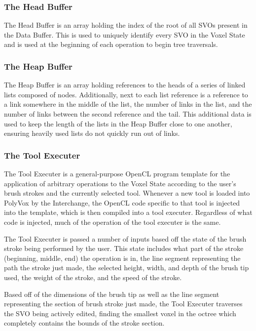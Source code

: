 \documentclass[onecolumn, draftclsnofoot,10pt, compsoc]{IEEEtran}
\begin{document}
\subsubsection{The Head Buffer}

The Head Buffer is an array holding the index of the root of all SVOs present in the Data Buffer. This is used to uniquely identify every SVO in the Voxel State and is used at the beginning of each operation to begin tree traversals.\\

\subsubsection{The Heap Buffer}

The Heap Buffer is an array holding references to the heads of a series of linked lists composed of nodes. Additionally, next to each list reference is a reference to a link somewhere in the middle of the list, the number of links in the list, and the number of links between the second reference and the tail. This additional data is used to keep the length of the lists in the Heap Buffer close to one another, ensuring heavily used lists do not quickly run out of links.\\


\subsubsection{The Tool Executer}

The Tool Executer is a general-purpose OpenCL program template for the application of arbitrary operations to the Voxel State according to the user’s brush strokes and the currently selected tool. Whenever a new tool is loaded into PolyVox by the Interchange, the OpenCL code specific to that tool is injected into the template, which is then compiled into a tool executer. Regardless of what code is injected, much of the operation of the tool executer is the same.

The Tool Executer is passed a number of inputs based off the state of the brush stroke being performed by the user. This state includes what part of the stroke (beginning, middle, end) the operation is in, the line segment representing the path the stroke just made, the selected height, width, and depth of the brush tip used, the weight of the stroke, and the speed of the stroke.

Based off of the dimensions of the brush tip as well as the line segment representing the section of brush stroke just made, the Tool Executer traverses the SVO being actively edited, finding the smallest voxel in the octree which completely contains the bounds of the stroke section.
\end{document}
